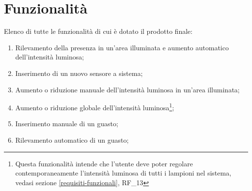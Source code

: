 \section{Funzionalità}
Elenco di tutte le funzionalità di cui è dotato il prodotto finale:
\begin{enumerate}
    \item Rilevamento della presenza in un'area illuminata e aumento automatico dell'intensità luminosa;
    \item Inserimento di un nuovo sensore a sistema;
    \item Aumento o riduzione manuale dell'intensità luminosa in un'area illuminata;
    \item Aumento o riduzione globale dell'intensità luminosa\footnote{Questa funzionalità intende che l'utente deve poter regolare contemporaneamente l'intensità luminosa di tutti i lampioni nel sistema, vedasi sezione \ref{requisiti-funzionali}, RF\_13};
    \item Inserimento manuale di un guasto;
    \item Rilevamento automatico di un guasto;
\end{enumerate}
